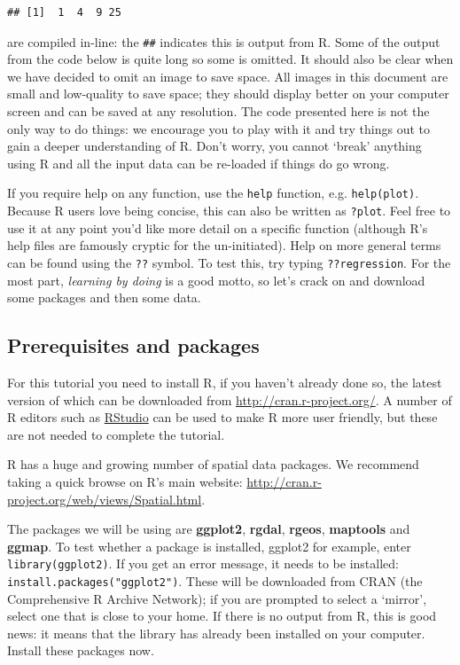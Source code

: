 \documentclass[]{article}
\begin{document}
\begin{verbatim}
## [1]  1  4  9 25
\end{verbatim}

are compiled in-line: the \texttt{\#\#} indicates this is output from R.
Some of the output from the code below is quite long so some is omitted.
It should also be clear when we have decided to omit an image to save
space. All images in this document are small and low-quality to save
space; they should display better on your computer screen and can be
saved at any resolution. The code presented here is not the only way to
do things: we encourage you to play with it and try things out to gain a
deeper understanding of R. Don't worry, you cannot `break' anything
using R and all the input data can be re-loaded if things do go wrong.

If you require help on any function, use the \texttt{help} function,
e.g. \texttt{help(plot)}. Because R users love being concise, this can
also be written as \texttt{?plot}. Feel free to use it at any point
you'd like more detail on a specific function (although R's help files
are famously cryptic for the un-initiated). Help on more general terms
can be found using the \texttt{??} symbol. To test this, try typing
\texttt{??regression}. For the most part, \emph{learning by doing} is a
good motto, so let's crack on and download some packages and then some
data.

\subsection{Prerequisites and
packages}\label{prerequisites-and-packages}

For this tutorial you need to install R, if you haven't already done so,
the latest version of which can be downloaded from
\url{http://cran.r-project.org/}. A number of R editors such as
\href{http://www.rstudio.com/}{RStudio} can be used to make R more user
friendly, but these are not needed to complete the tutorial.

R has a huge and growing number of spatial data packages. We recommend
taking a quick browse on R's main website:
\url{http://cran.r-project.org/web/views/Spatial.html}.

The packages we will be using are \textbf{ggplot2}, \textbf{rgdal},
\textbf{rgeos}, \textbf{maptools} and \textbf{ggmap}. To test whether a
package is installed, ggplot2 for example, enter
\texttt{library(ggplot2)}. If you get an error message, it needs to be
installed: \texttt{install.packages("ggplot2")}. These will be
downloaded from CRAN (the Comprehensive R Archive Network); if you are
prompted to select a `mirror', select one that is close to your home. If
there is no output from R, this is good news: it means that the library
has already been installed on your computer. Install these packages now.
\end{document}
